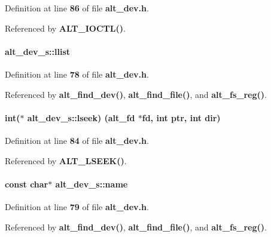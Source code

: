 Definition at line {\bf 86} of file {\bf alt\+\_\+dev.\+h}.



Referenced by {\bf A\+L\+T\+\_\+\+I\+O\+C\+T\+L()}.

\paragraph[{llist}]{ alt\+\_\+dev\+\_\+s\+::llist}\label{structalt__dev__s_af1d577bc711b31f5269ae035a1d0a8eb}


Definition at line {\bf 78} of file {\bf alt\+\_\+dev.\+h}.



Referenced by {\bf alt\+\_\+find\+\_\+dev()}, {\bf alt\+\_\+find\+\_\+file()}, and {\bf alt\+\_\+fs\+\_\+reg()}.

\paragraph[{lseek}]{\setlength{\rightskip}{0pt plus 5cm}int($\ast$ alt\+\_\+dev\+\_\+s\+::lseek) ({\bf alt\+\_\+fd} $\ast$fd, int ptr, int dir)}\label{structalt__dev__s_a0f7548fcb369e8a5c66178de99272d48}


Definition at line {\bf 84} of file {\bf alt\+\_\+dev.\+h}.



Referenced by {\bf A\+L\+T\+\_\+\+L\+S\+E\+E\+K()}.

\paragraph[{name}]{\setlength{\rightskip}{0pt plus 5cm}const char$\ast$ alt\+\_\+dev\+\_\+s\+::name}\label{structalt__dev__s_a9ad12f8269203b5d5a843e14e123d5f3}


Definition at line {\bf 79} of file {\bf alt\+\_\+dev.\+h}.



Referenced by {\bf alt\+\_\+find\+\_\+dev()}, {\bf alt\+\_\+find\+\_\+file()}, and {\bf alt\+\_\+fs\+\_\+reg()}.

